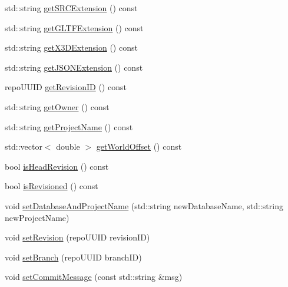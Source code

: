 \begin{DoxyCompactItemize}
std\+::string \hyperlink{classrepo_1_1core_1_1model_1_1_repo_scene_a1a5748642960ad1ae321046eaf7c92eb}{get\+S\+R\+C\+Extension} () const 
\item 
std\+::string \hyperlink{classrepo_1_1core_1_1model_1_1_repo_scene_a656d124c4a6fcb3ea4725928cccc17b6}{get\+G\+L\+T\+F\+Extension} () const 
\item 
std\+::string \hyperlink{classrepo_1_1core_1_1model_1_1_repo_scene_aff5298094e5c75f27b71a9369300f028}{get\+X3\+D\+Extension} () const 
\item 
std\+::string \hyperlink{classrepo_1_1core_1_1model_1_1_repo_scene_aa348500c35ed75184ba4b49c0ecab775}{get\+J\+S\+O\+N\+Extension} () const 
\item 
repo\+U\+U\+I\+D \hyperlink{classrepo_1_1core_1_1model_1_1_repo_scene_aae6865fe4b3c52ab55d04f162ca1b7bf}{get\+Revision\+I\+D} () const 
\item 
std\+::string \hyperlink{classrepo_1_1core_1_1model_1_1_repo_scene_a9d43a9e2ff7e75bc759f475b09d38b70}{get\+Owner} () const 
\item 
std\+::string \hyperlink{classrepo_1_1core_1_1model_1_1_repo_scene_abfdb99dde6895c7226c3514218728bca}{get\+Project\+Name} () const 
\item 
std\+::vector$<$ double $>$ \hyperlink{classrepo_1_1core_1_1model_1_1_repo_scene_ad577dfbbb9da631406933437bc456f37}{get\+World\+Offset} () const 
\item 
bool \hyperlink{classrepo_1_1core_1_1model_1_1_repo_scene_a3c6968fb82e20a6694c1be5170a0bc2b}{is\+Head\+Revision} () const 
\item 
bool \hyperlink{classrepo_1_1core_1_1model_1_1_repo_scene_a8d69fafb52e9a73548d7c22ebbcb562c}{is\+Revisioned} () const 
\item 
void \hyperlink{classrepo_1_1core_1_1model_1_1_repo_scene_a01d7c23a6df5b726b636c518a5a72a35}{set\+Database\+And\+Project\+Name} (std\+::string new\+Database\+Name, std\+::string new\+Project\+Name)
\item 
void \hyperlink{classrepo_1_1core_1_1model_1_1_repo_scene_a0782d1edcdf37539614f93fe7a1fdc0f}{set\+Revision} (repo\+U\+U\+I\+D revision\+I\+D)
\item 
void \hyperlink{classrepo_1_1core_1_1model_1_1_repo_scene_ac2caff05d438979474b4e393edce1ccd}{set\+Branch} (repo\+U\+U\+I\+D branch\+I\+D)
\item 
void \hyperlink{classrepo_1_1core_1_1model_1_1_repo_scene_a346ae9182f19ed55b48c377523dc35ee}{set\+Commit\+Message} (const std\+::string \&msg)
\item 

\end{DoxyCompactItemize}
